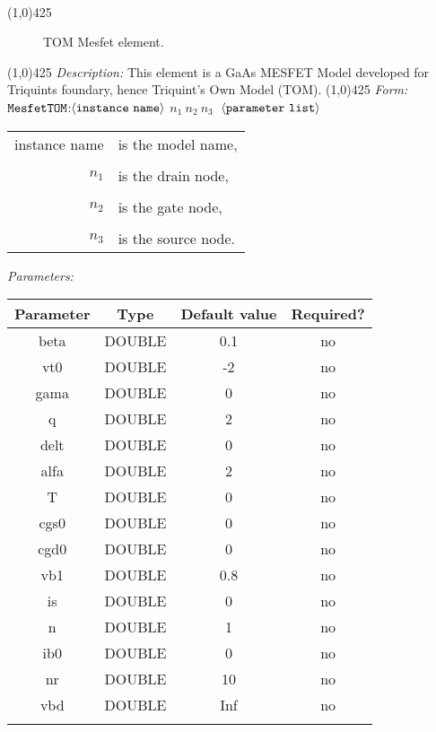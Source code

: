 \documentclass{article}
\begin{document}
\\
\hrulefill \linethickness{0.5mm}\line(1,0){425}
\normalsize
\newline
\begin{figure}[h]
\centerline{\epsfxsize=1in} \caption{TOM Mesfet element.}
\end{figure}
\newline
\linethickness{0.5mm}\line(1,0){425}
\newline
\textit{Description:}
\newline
This element is a GaAs MESFET Model developed for Triquints
foundary, hence Triquint's Own Model (TOM).
\newline
\linethickness{0.5mm}\line(1,0){425}
\newline
\textit{Form:}
$\tt MesfetTOM$:$\langle \tt{instance\ name}\rangle$ $n_1\ n_2\ n_3\ $
$\langle \tt{parameter\ list}\rangle$
\newline
\begin{tabular}{r l}
instance name & is the model name, \\
&  \\
$n_1$ & is the drain node, \\
&  \\
$n_2$ & is the gate node, \\
&  \\
$n_3$ & is the source node. \\
\end{tabular}
\newpage
\textit{Parameters:}
\begin{table}[H]
\begin{tabular}{|c|c|c|c|}
\hline
Parameter&Type&Default value&Required?\\
\hline
beta & DOUBLE & 0.1 & no \\
\hline
vt0 & DOUBLE & -2 & no \\
\hline
gama & DOUBLE & 0 & no \\
\hline
q & DOUBLE & 2 & no \\
\hline
delt & DOUBLE & 0 & no \\
\hline
alfa & DOUBLE & 2 & no \\
\hline
T & DOUBLE & 0 & no \\
\hline
cgs0 & DOUBLE & 0 & no \\
\hline
cgd0 & DOUBLE & 0 & no \\
\hline
vb1 & DOUBLE & 0.8 & no \\
\hline
is & DOUBLE & 0 & no \\
\hline
n & DOUBLE & 1 & no \\
\hline
ib0 & DOUBLE & 0 & no \\
\hline
nr & DOUBLE & 10 & no \\
\hline
vbd & DOUBLE & Inf & no \\
\par
\hline
\end{tabular}
\end{table}
\end{document}
